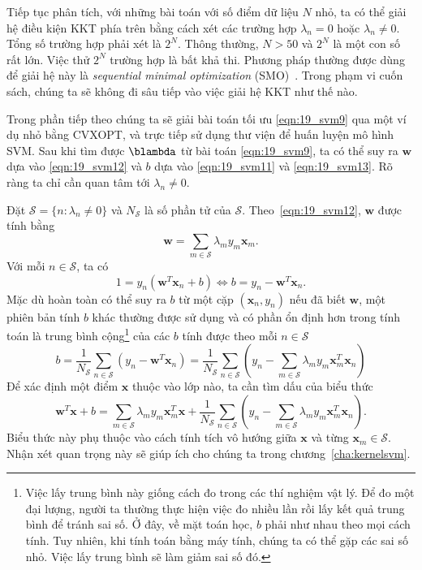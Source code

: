 Tiếp tục phân tích, với những bài toán với số điểm dữ liệu $N$ nhỏ, ta có thể
giải hệ điều kiện KKT phía trên bằng cách xét các trường hợp $\lambda_n = 0$
hoặc $\lambda_n \neq 0$. Tổng số trường hợp phải xét là $2^N$. Thông thường, $N
> 50$ và $2^N$ là một con số rất lớn. Việc thử $2^N$ trường hợp là bất khả thi.
Phương pháp thường được dùng để giải hệ này là \textit{sequential minimal
optimization} (SMO)~\cite{platt1998sequential,zeng2008fast}. Trong phạm vi cuốn
sách, chúng ta sẽ không đi sâu tiếp vào việc giải hệ KKT như thế nào.

Trong phần tiếp
theo chúng ta sẽ giải bài toán tối ưu \eqref{eqn:19_svm9} qua một ví dụ nhỏ bằng CVXOPT, và trực tiếp sử dụng thư viện  để huấn luyện mô hình SVM.
 Sau khi tìm được $\blambda$ từ bài toán \eqref{eqn:19_svm9}, ta có thể suy ra $\mathbf{w}$ dựa vào \eqref{eqn:19_svm12} và $b$ dựa vào
\eqref{eqn:19_svm11} và \eqref{eqn:19_svm13}. Rõ ràng ta chỉ cần quan tâm tới
$\lambda_n \neq 0$.
 
Đặt $\mathcal{S} = \{n: \lambda_n \neq 0\}$ và $N_{\mathcal{S}}$ là số
phần tử của $\mathcal{S}$. Theo~\eqref{eqn:19_svm12}, $\mathbf{w}$ được tính bằng
\begin{equation} 
\label{eqn:19_}
\mathbf{w} = \sum_{m \in \mathcal{S}} \lambda_m y_m \mathbf{x}_m. 
\end{equation} 
Với mỗi $n \in \mathcal{S}$, ta có
\begin{equation*}  
1 = y_n(\mathbf{w}^T\mathbf{x}_n + b) \Leftrightarrow b = y_n  - \mathbf{w}^T\mathbf{x}_n.
\end{equation*}  
Mặc dù hoàn toàn có thể suy ra $b$ từ một cặp $(\mathbf{x}_n, y_n)$
nếu đã biết $\mathbf{w}$, một phiên bản tính $b$ khác thường được sử dụng và có phần {ổn định hơn trong tính toán} 
là trung bình cộng\footnote{Việc lấy trung bình này giống cách đo trong các thí
nghiệm vật lý. Để đo một đại lượng, người ta thường thực hiện việc đo nhiều lần
rồi lấy kết quả trung bình để tránh sai số. Ở đây, về mặt toán học, $b$ phải như
nhau theo mọi cách tính. Tuy nhiên, khi tính toán bằng máy tính, chúng ta có thể
gặp các sai số nhỏ. Việc lấy trung bình sẽ làm giảm sai số đó.}  của các
$b$ tính được theo mỗi $n \in
\mathcal{S}$
\begin{equation}
\label{eqn:19_svm15}
    b = \frac{1}{N_{\mathcal{S}}} \sum_{n \in \mathcal{S}}(y_n - \mathbf{w}^T\mathbf{x}_n) = 
    \frac{1}{N_{\mathcal{S}}} \sum_{n \in \mathcal{S}} \left(y_n - \sum_{m\in
    \mathcal{S}} \lambda_m y_m \mathbf{x}_m^T \mathbf{x}_n\right)
\end{equation} 
Để xác định một điểm $\mathbf{x}$ thuộc vào lớp nào, ta cần tìm dấu
của biểu thức
\begin{equation*} 
\mathbf{w}^T\mathbf{x} + b = \sum_{m \in \mathcal{S}} \lambda_m y_m
\mathbf{x}_m^T \mathbf{x} + \frac{1}{N_{\mathcal{S}}} \sum_{n \in \mathcal{S}}
\left(y_n - \sum_{m\in \mathcal{S}} \lambda_m y_m \mathbf{x}_m^T \mathbf{x}_n\right). 
\end{equation*} 
Biểu thức này phụ thuộc vào cách tính tích vô hướng giữa $\mathbf{x}$ và từng
$\mathbf{x}_m \in \mathcal{S}$. Nhận xét quan trọng này sẽ giúp ích cho chúng ta
trong chương~\ref{cha:kernelsvm}.
 
